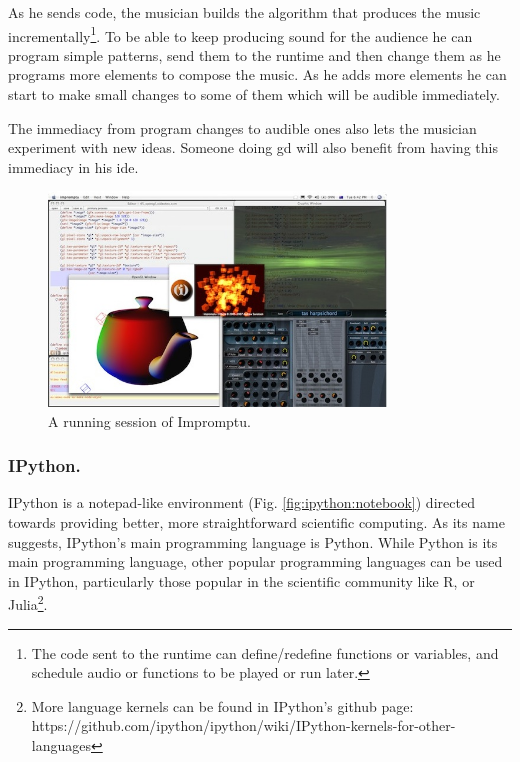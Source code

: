 \documentclass{./llncs2e/llncs}
\begin{document}
	As he sends code, the musician builds the algorithm that produces the music incrementally\footnote{
		The code sent to the runtime can define/redefine functions or variables, and schedule audio or functions to be played or run later.}.
	To be able to keep producing sound for the audience he can program simple patterns, send them to the runtime and then change them as he programs more elements to compose the music.
	As he adds more elements he can start to make small changes to some of them which will be audible immediately.
	
	The immediacy from program changes to audible ones also lets the musician experiment with new ideas.
	Someone doing \ac{gd} will also benefit from having this immediacy in his \ac{ide}.
	
	\begin{figure}
		\centering
		\includegraphics[width=0.8\textwidth]{img/impromptu_example}
		\caption{A running session of Impromptu.}
		\label{fig:ex:impromptu}
	\end{figure}
	
	
\subsubsection{IPython.}
	IPython\cite{PER-GRA:2007} is a notepad-like environment (Fig. \ref{fig:ipython:notebook}) directed towards providing better, more straightforward scientific computing. 
	As its name suggests, IPython's main programming language is Python. 
	While Python is its main programming language, other popular programming languages can be used in IPython, particularly those popular in the scientific community like R, or Julia\footnote{
		More language kernels can be found in IPython's github page: https://github.com/ipython/ipython/wiki/IPython-kernels-for-other-languages}.
		
\end{document}
